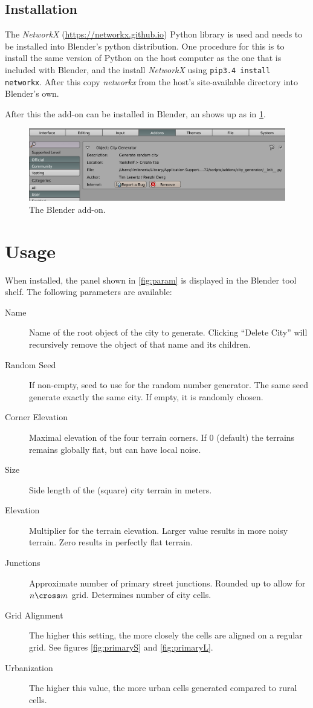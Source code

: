 \documentclass[a4paper,12pt]{scrartcl}
\begin{document}
\subsection{Installation}
The \emph{NetworkX} (\url{https://networkx.github.io}) Python library is used and needs to be installed into Blender's python distribution. One procedure for this is to install the same version of Python on the host computer as the one that is included with Blender, and the install \emph{NetworkX} using \texttt{pip3.4 install networkx}. After this copy \emph{networkx} from the host's {site-available} directory into Blender's own.

After this the add-on can be installed in Blender, an shows up as in \ref{fig:addon}.

\begin{figure}[h]
\center
\includegraphics[width=\textwidth]{addon.png}
\caption{The Blender add-on.}
\label{fig:addon}
\end{figure}


\section{Usage}
When installed, the panel shown in \ref{fig:param} is displayed in the Blender tool shelf. The following parameters are available:
\begin{description}
\item[Name] Name of the root object of the city to generate. Clicking ``Delete City'' will recursively remove the object of that name and its children.
\item[Random Seed] If non-empty, seed to use for the random number generator. The same seed generate exactly the same city. If empty, it is randomly chosen.
\item[Corner Elevation] Maximal elevation of the four terrain corners. If 0 (default) the terrains remains globally flat, but can have local noise.
\item[Size] Side length of the (square) city terrain in meters.
\item[Elevation] Multiplier for the terrain elevation. Larger value results in more noisy terrain. Zero results in perfectly flat terrain.
\item[Junctions] Approximate number of primary street junctions. Rounded up to allow for $n \cross m$ grid. Determines number of city cells.
\item[Grid Alignment] The higher this setting, the more closely the cells are aligned on a regular grid. See figures \ref{fig:primaryS} and \ref{fig:primaryL}.
\item[Urbanization] The higher this value, the more urban cells generated compared to rural cells.
\end{description}
\end{document}
